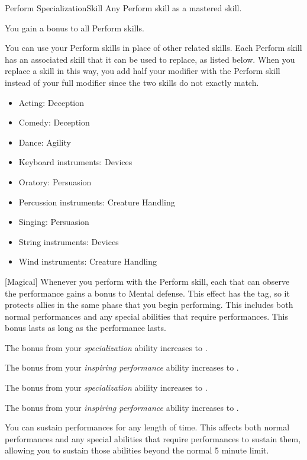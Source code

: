     \begin{feat}{Perform Specialization}{Skill}
        \featpre Any Perform skill as a mastered skill.

         You gain a  bonus to all Perform skills.

         You can use your Perform skills in place of other related skills.
        Each Perform skill has an associated skill that it can be used to replace, as listed below.
        When you replace a skill in this way, you add half your modifier with the Perform skill instead of your full modifier since the two skills do not exactly match.
        \begin{itemize}
            \item Acting: Deception
            \item Comedy: Deception
            \item Dance: Agility
            \item Keyboard instruments: Devices
            \item Oratory: Persuasion
            \item Percussion instruments: Creature Handling
            \item Singing: Persuasion
            \item String instruments: Devices
            \item Wind instruments: Creature Handling
        \end{itemize}

        [Magical] Whenever you perform with the Perform skill, each  that can observe the performance gains a  bonus to Mental defense.
        This effect has the  tag, so it protects allies in the same phase that you begin performing.
        This includes both normal performances and any special abilities that require performances.
        This bonus lasts as long as the performance lasts.

         The bonus from your \textit{specialization} ability increases to .

         The bonus from your \textit{inspiring performance} ability increases to .

         The bonus from your \textit{specialization} ability increases to .

         The bonus from your \textit{inspiring performance} ability increases to .

         You can sustain performances for any length of time.
        This affects both normal performances and any special abilities that require performances to sustain them, allowing you to sustain those abilities beyond the normal 5 minute limit.
    \end{feat}

